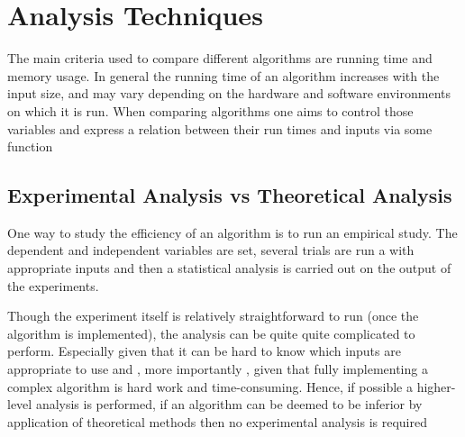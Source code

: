 \section{Analysis Techniques} 





		\par{The main criteria used to compare different algorithms are running time and memory usage. In general the running time of an algorithm increases with the
		input size, and may vary depending on the hardware and software environments on which it is run. When comparing algorithms one aims to control those variables
		and express a relation between their run times and inputs via some function}

\subsection{Experimental Analysis vs Theoretical Analysis}

		\par{One way to study the efficiency of an algorithm is to run an empirical study. The dependent and independent variables are set, several trials are run a
		with appropriate inputs and then a statistical analysis is carried out on the output of the experiments.}



		\par{Though the experiment itself is relatively straightforward to run (once the algorithm is implemented), the analysis can be quite quite complicated to
		perform. Especially given that it can be hard to know which inputs are appropriate to use and , more importantly , given that fully implementing a complex algorithm is hard
		work and time-consuming. Hence, if possible a higher-level analysis is performed, if an algorithm can be deemed to be inferior by application of theoretical
		methods then no experimental analysis is required}


